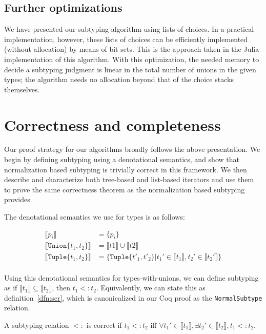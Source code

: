 \documentclass[a4paper,english]{lipics-v2019}
\newcommand{\xt}[1]{\texttt{#1}}
\newcommand{\tuplet}[2]{\xt{Tuple\{}#1,#2\xt{\}}}
\newcommand{\union}[2]{\xt{Union\{}#1,#2\xt{\}}}
\newcommand{\denotes}[1]{\llbracket #1 \rrbracket}
\begin{document}
\subsection{Further optimizations}

We have presented our subtyping algorithm using lists of choices. In a
practical implementation, however, these lists of choices can be efficiently
implemented (without allocation) by means of bit sets. This is the approach
taken in the Julia implementation of this algorithm. With this optimization,
the needed memory to decide a subtyping judgment is linear in the total number
of unions in the given types; the algorithm needs no allocation beyond that
of the choice stacks themselves.

\section{Correctness and completeness}

Our proof strategy for our algorithms broadly follows the above presentation.
We begin by defining subtyping using a denotational semantics, and show that
normalization based subtyping is trivially correct in this framework. We then
describe and characterize both tree-based and list-based iterators and use
them to prove the same correctness theorem as the normalization based
subtyping provides.

The denotational semantics we use for types is as follows:

\begin{align*}
\denotes{p_i} &= \{p_i\} \\
\denotes{\union{t_1}{t_2}} &= \denotes{t1} \cup \denotes{t2} \\
\denotes{\tuplet{t_1}{t_2}} &= \{\tuplet{t'_1}{t'_2} | t_1' \in \denotes{t_1},  t_2' \in \denotes{t_2'}\} \\
\end{align*}

Using this denotational semantics for types-with-unions, we can define
subtyping as if $\denotes{t_1} \subseteq \denotes{t_2}$, then $t_1 <: t_2$.
Equivalently, we can state this as definition~\ref{dfn:scr}, which is canonicalized
in our Coq proof as the \verb|NormalSubtype| relation.

\begin{definition}
A subtyping relation $<:$ is correct if $t_1 <: t_2$ iff $\forall t_1' \in \denotes{t_1},
\exists t_2' \in \denotes{t_2}, t_1 <: t_2$.
\label{dfn:scr}
\end{definition}
\end{document}
